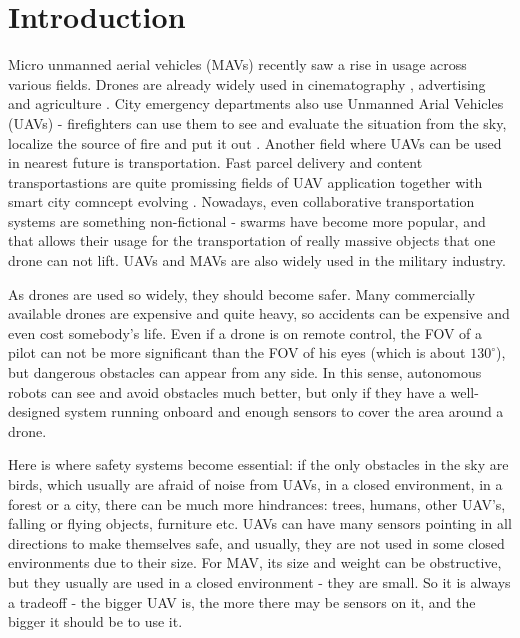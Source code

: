 \chapter{Introduction}

\label{chapter:intro}

Micro unmanned aerial vehicles (MAVs) recently saw a rise in usage across various fields. 
Drones are already widely used in cinematography \cite{Mademlis2020}, advertising \cite{Ullah2021} and agriculture \cite{Kim2019}. 
City emergency departments also use Unmanned Arial Vehicles (UAVs) - firefighters can use them to see and evaluate the situation from the sky, localize the source of fire and put it out \cite{Pritzl2021}.
Another field where UAVs can be used in nearest future is transportation. 
Fast parcel delivery \cite{She2021} and content transportastions \cite{Gupta2021,Aloqaily2022} are quite promissing fields of UAV application together with smart city comncept evolving \cite{Ortiz2019}.
Nowadays, even collaborative transportation systems are something non-fictional - swarms have become more popular, and that allows their usage for the transportation of really massive objects \cite{Bacelar2020} that one drone can not lift. 
UAVs and MAVs are also widely used in the military industry.

As drones are used so widely, they should become safer. 
Many commercially available drones are expensive and quite heavy, so accidents can be expensive and even cost somebody's life. 
Even if a drone is on remote control, the FOV of a pilot can not be more significant than the FOV of his eyes (which is about $130^\circ$), but dangerous obstacles can appear from any side.
In this sense, autonomous robots can see and avoid obstacles much better, but only if they have a well-designed system running onboard and enough sensors to cover the area around a drone.

Here is where safety systems become essential: if the only obstacles in the sky are birds, which usually are afraid of noise from UAVs, in a closed environment, in a forest or a city, there can be much more hindrances: trees, humans, other UAV's, falling or flying objects, furniture etc.
UAVs can have many sensors pointing in all directions to make themselves safe, and usually, they are not used in some closed environments due to their size.
For MAV, its size and weight can be obstructive, but they usually are used in a closed environment - they are small.
So it is always a tradeoff - the bigger UAV is, the more there may be sensors on it, and the bigger it should be to use it. 

